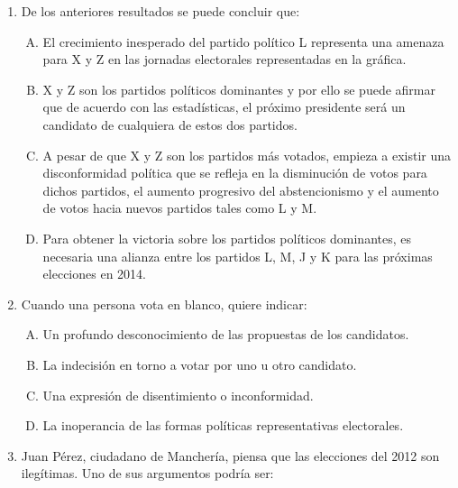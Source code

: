 \begin{enumerate}
\item De los anteriores resultados se puede concluir que:\label{socandres-20}

\begin{enumerate}[(A)]
\item El crecimiento inesperado del partido político L representa una amenaza para X y Z en las jornadas electorales representadas en la gráfica.
\item X y Z son los partidos políticos dominantes y por ello se puede afirmar que de acuerdo con las estadísticas, el próximo presidente será un candidato de cualquiera de estos dos partidos.
\item A pesar de que X y Z son los partidos más votados, empieza a existir una disconformidad política que se refleja en la disminución de votos para dichos partidos, el aumento progresivo del abstencionismo y el aumento de votos hacia nuevos partidos tales como L y M.
\item Para obtener la victoria sobre los partidos políticos dominantes, es necesaria una alianza entre los partidos L, M, J y K para las próximas elecciones en 2014.   

\end{enumerate}

\item Cuando una persona vota en blanco, quiere indicar:\label{socandres-21}

\begin{enumerate}[(A)]
\item Un profundo desconocimiento de las propuestas de los candidatos.
\item La indecisión en torno a votar por uno u otro candidato.
\item Una expresión de disentimiento o inconformidad.
\item La inoperancia de las formas políticas representativas electorales.

\end{enumerate}

\item Juan Pérez, ciudadano de Manchería, piensa que las elecciones del 2012 son ilegítimas. Uno de sus argumentos podría ser:\label{socandres-22}


\end{enumerate}
